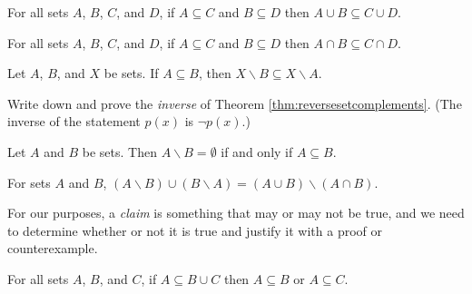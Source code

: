 \begin{theorem} For all sets $A$, $B$, $C$, and $D$, if $A\subseteq C$ and $B\subseteq D$ then $A\cup B \subseteq C\cup D$.
\end{theorem}

\begin{theorem} For all sets $A$, $B$, $C$, and $D$, if $A\subseteq C$ and $B\subseteq D$ then $A\cap B \subseteq C\cap D$.
\end{theorem}

\begin{theorem} \label{thm:reversesetcomplements}Let $A$, $B$, and $X$ be sets. If $A \subseteq B$, then $X \smallsetminus B \subseteq X \smallsetminus A$.
\end{theorem}

\begin{exercise} Write down and prove the \textit{inverse} of Theorem \ref{thm:reversesetcomplements}. (The inverse of the statement $p(x)$ is $\neg p(x)$.)
\end{exercise}

\begin{theorem} Let $A$ and $B$ be sets. Then $A\smallsetminus B = \emptyset$ if and only if $A \subseteq B$.
\end{theorem}

\begin{theorem} For sets $A$ and $B$, $(A\smallsetminus B)\cup (B\smallsetminus A) = (A\cup B) \smallsetminus (A\cap B)$.
\end{theorem}

For our purposes, a \textit{claim} is something that may or may not be true, and we need to determine whether or not it is true and justify it with a proof or counterexample.

\begin{claim} For all sets $A$, $B$, and $C$, if $A \subseteq B\cup C$ then $A\subseteq B$ or $A\subseteq C$.
\end{claim}

